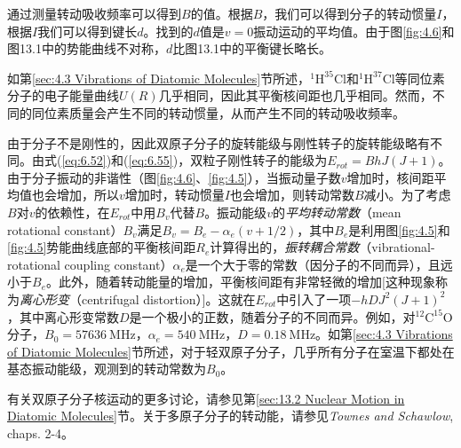     通过测量转动吸收频率可以得到$B$的值。根据$B$，我们可以得到分子的转动惯量$I$，根据$I$我们可以得到键长$d$。找到的$d$值是$v=0$振动运动的平均值。由于图\ref{fig:4.6}和图13.1中的势能曲线不对称，$d$比图13.1中的平衡键长略长。

    如第\ref{sec:4.3 Vibrations of Diatomic Molecules}节所述，$^1\mathrm{H}^{35}\mathrm{Cl}$和$^1\mathrm{H}^{37}\mathrm{Cl}$等同位素分子的电子能量曲线$U\left(R\right)$几乎相同，因此其平衡核间距也几乎相同。然而，不同的同位素质量会产生不同的转动惯量，从而产生不同的转动吸收频率。

    由于分子不是刚性的，因此双原子分子的旋转能级与刚性转子的旋转能级略有不同。由式(\ref{eq:6.52})和(\ref{eq:6.55})，双粒子刚性转子的能级为$E_{rot} = BhJ\left(J+1\right)$。由于分子振动的非谐性（图\ref{fig:4.6}、\ref{fig:4.5}），当振动量子数$v$增加时，核间距平均值也会增加，所以$v$增加时，转动惯量$I$也会增加，则转动常数$B$减小。为了考虑$B$对$v$的依赖性，在$E_{rot}$中用$B_v$代替$B$。振动能级$v$的\textit{平均转动常数}（mean rotational constant）$B_v$满足$B_v = B_e - \alpha_e\left(v+1/2\right)$，其中$B_e$是利用图\ref{fig:4.5}和\ref{fig:4.5}势能曲线底部的平衡核间距$R_e$计算得出的，\textit{振转耦合常数}（vibrational-rotational coupling constant）$\alpha_e$是一个大于零的常数（因分子的不同而异），且远小于$B_e$。此外，随着转动能量的增加，平衡核间距有非常轻微的增加[这种现象称为\textit{离心形变}（centrifugal distortion）]。这就在$E_{rot}$中引入了一项$-hDJ^2\left(J+1\right)^2$，其中离心形变常数$D$是一个极小的正数，随着分子的不同而异。例如，对$^{12}\mathrm{C}^{15}\mathrm{O}$分子，$B_0 = 57636 \: \mathrm{MHz}$，$\alpha_e = 540 \: \mathrm{MHz}$，$D = 0.18 \: \mathrm{MHz}$。如第\ref{sec:4.3 Vibrations of Diatomic Molecules}节所述，对于轻双原子分子，几乎所有分子在室温下都处在基态振动能级，观测到的转动常数为$B_0$。

    有关双原子分子核运动的更多讨论，请参见第\ref{sec:13.2 Nuclear Motion in Diatomic Molecules}节。关于多原子分子的转动能，请参见\textit{Townes and Schawlow}, chaps. 2-4。

